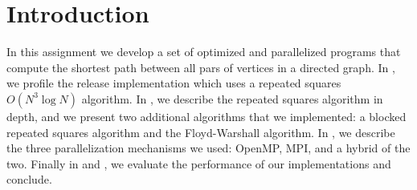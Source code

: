\section{Introduction}\label{sec:intro}
In this assignment we develop a set of optimized and parallelized programs that
compute the shortest path between all pars of vertices in a directed graph. In
, we profile the release implementation which uses a repeated
squares $O(N^3 \log N)$ algorithm. In , we describe the repeated
squares algorithm in depth, and we present two additional algorithms that we
implemented: a blocked repeated squares algorithm and the Floyd-Warshall
algorithm. In , we describe the three parallelization
mechanisms we used: OpenMP, MPI, and a hybrid of the two. Finally in
 and , we evaluate the performance of our
implementations and conclude.
